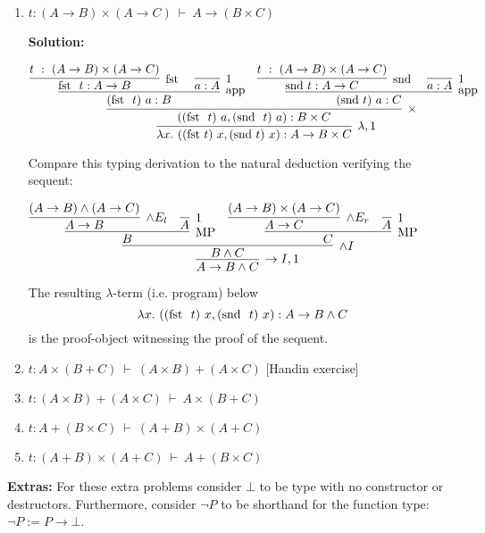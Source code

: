 \documentclass[11pt]{report}
\begin{document}
\begin{enumerate}
\begin{enumerate}
		\newpage
		\item $t : (A \to B) \times (A \to C) \ \vdash \ A \to (B \times C)$
					
			{\bf Solution:}			
			\begin{center}
				$\infer[\lambda,1]{\lambda x. \ ((\fst t) \ x, (\snd t) \ x) : A \to B \times C}
					{\infer[\times]{((\fst \ t) \ a, (\snd \ t) \ a) : B \times C}
						{\infer[\app]{(\fst \ t) \ a : B}
							{\infer[\fst]{\fst \ t : A \to B}
								{t \ : \ (A \to B) \times (A \to C)}
							&
							\infer[1]{a:A}{}}
						&
						\infer[\app]{(\snd t) \ a : C}
							{\infer[\snd]{\snd t : A \to C}
								{t \ : \ (A \to B) \times (A \to C)}
							&
							\infer[1]{a:A}{}}}}$			
			\end{center}
			Compare this typing derivation to the natural deduction verifying the sequent:
			\begin{center}
				$\infer[\to I,1]{A \to B \land C}
					{\infer[\land I]{B \land C}
						{\infer[\MP]{B}
							{\infer[\land E_{l}]{A \to B}
								{(A \to B) \land (A \to C)}
							&
							\infer[1]{A}{}}
						&
						\infer[\MP]{C}
							{\infer[\land E_{r}]{A \to C}
								{(A \to B) \times (A \to C)}
							&
							\infer[1]{A}{}}}}$			
			\end{center}
			The resulting $\lambda$-term (i.e. program) below
			$$\lambda x. \ ((\fst \ t) \ x, (\snd \ t) \ x) : A \to B \land C$$
			is the proof-object witnessing the proof of the sequent.
		
		\newpage
		\item $t : A \times (B + C) \ \vdash \ (A \times B) + (A \times C)$ \hfill [Handin exercise]
		
		\newpage
		\item $t : (A \times B) + (A \times C) \ \vdash \ A \times (B + C)$
		
		\newpage
		\item $t : A + (B \times C) \ \vdash \ (A + B) \times (A + C)$
		
		\newpage
		\item $t : (A + B) \times (A + C) \ \vdash \ A + (B \times C)$
	\end{enumerate}
	
		\newpage
		{\bf Extras:} For these extra problems consider $\bot$ to be type with no constructor or destructors. Furthermore, consider $\lnot P$ to be shorthand for the function type: $\lnot P:= P \to \bot$.


\end{enumerate}
\end{document}
